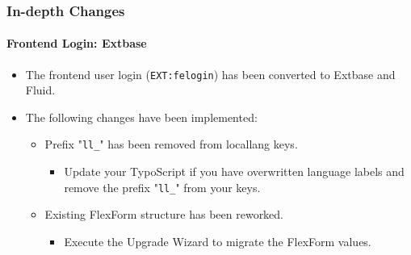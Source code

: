 
\begin{frame}[fragile]
	\frametitle{In-depth Changes}
	\framesubtitle{Frontend Login: Extbase}

	\begin{itemize}
		\item The frontend user login (\texttt{EXT:felogin}) has been converted to Extbase and Fluid.

		\item The following changes have been implemented:

		\begin{itemize}
			\item[\ding{202}] Prefix "\texttt{ll\_}" has been removed from locallang keys.

				\begin{itemize}
					\item[\ding{228}] Update your TypoScript if you have overwritten language labels and remove the prefix "\texttt{ll\_}" from your keys.
				\end{itemize}

			\item[\ding{203}] Existing FlexForm structure has been reworked.

				\begin{itemize}
					\item[\ding{228}] Execute the Upgrade Wizard to migrate the FlexForm values.
				\end{itemize}

		\end{itemize}

	\end{itemize}

\end{frame}


